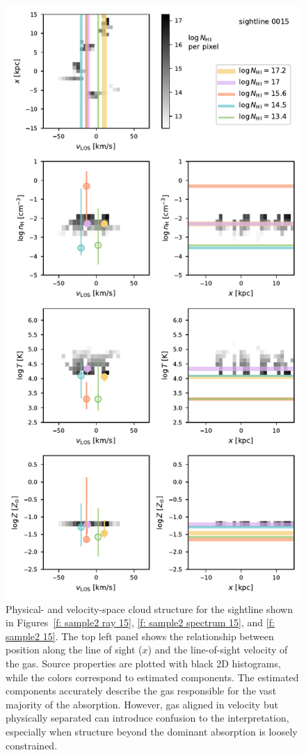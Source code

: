 \documentclass[fleqn,usenatbib]{mnras}
\begin{document}
\begin{figure}
    \centering
    \includegraphics[width=0.95\columnwidth]{figures/sample2/high-z/component_structure_0015.pdf}
    \caption{
    Physical- and velocity-space cloud structure for the sightline shown in Figures~\ref{f: sample2 ray 15}, \ref{f: sample2 spectrum 15}, and \ref{f: sample2 15}.
    The top left panel shows the relationship between position along the line of sight ($x$) and the line-of-sight velocity of the gas.
    Source properties are plotted with black 2D histograms,
    while the colors correspond to estimated components.
    The estimated components accurately describe the gas responsible for the vast majority of the absorption.
    However, gas aligned in velocity but physically separated can introduce confusion to the interpretation,
    especially when structure beyond the dominant absorption is loosely constrained.
    }
    \label{f: sample2 structure 15}
\end{figure}
\end{document}

